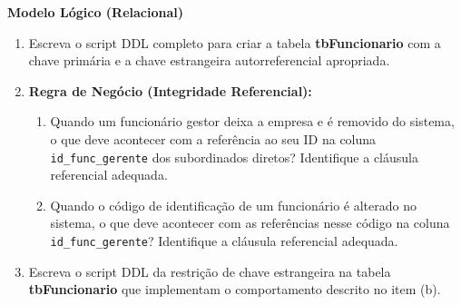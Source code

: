 \begin{center}
    \textbf{Modelo Lógico (Relacional)} \\[0.2cm]
\end{center}

\begin{enumerate}[label=\textbf{\alph*)}]
    \item Escreva o script DDL completo para criar a tabela \textbf{tbFuncionario} com a chave primária e a chave estrangeira autorreferencial apropriada.
    \resposta{4cm}
    
    \item \textbf{Regra de Negócio (Integridade Referencial):} 
    \begin{enumerate}[label=\arabic*.]
        \item Quando um funcionário gestor deixa a empresa e é removido do sistema, o que deve acontecer com a referência ao seu ID na coluna \texttt{id\_func\_gerente} dos subordinados diretos? Identifique a cláusula referencial adequada.
        \item Quando o código de identificação de um funcionário é alterado no sistema, o que deve acontecer com as referências nesse código na coluna \texttt{id\_func\_gerente}? Identifique a cláusula referencial adequada.
    \end{enumerate}
    \resposta{3cm}
    
    \item Escreva o script DDL da restrição de chave estrangeira na tabela \textbf{tbFuncionario} que implementam o comportamento descrito no item (b).
    \resposta{3cm}
\end{enumerate}

